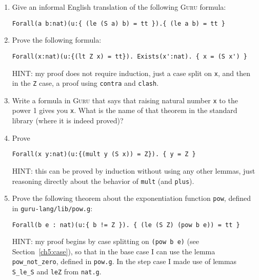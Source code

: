 \documentclass{book}[12pt]
\newcommand{\guru}[0]{\textsc{Guru}\xspace}
\begin{document}
\begin{enumerate}

\item Give an informal English translation of the following \guru formula:

\begin{verbatim}
Forall(a b:nat)(u:{ (le (S a) b) = tt }).{ (le a b) = tt }
\end{verbatim}

\item Prove the following formula:

\begin{verbatim}
Forall(x:nat)(u:{(lt Z x) = tt}). Exists(x':nat). { x = (S x') }
\end{verbatim}

\noindent HINT: my proof does not require induction, just a case split
on \texttt{x}, and then in the \texttt{Z} case, a proof using
\texttt{contra} and \texttt{clash}.

\item Write a formula in \guru that says that raising natural number
\texttt{x} to the power 1 gives you \texttt{x}.  What is the name of
that theorem in the standard library (where it is indeed proved)?

\item Prove

\begin{verbatim}
Forall(x y:nat)(u:{(mult y (S x)) = Z}). { y = Z }
\end{verbatim}

\noindent HINT: this can be proved by induction without using any
other lemmas, just reasoning directly about the behavior of
\texttt{mult} (and \texttt{plus}).

\item Prove the following theorem about the exponentiation function
\texttt{pow}, defined in \texttt{guru-lang/lib/pow.g}:

\begin{verbatim}
Forall(b e : nat)(u:{ b != Z }). { (le (S Z) (pow b e)) = tt }
\end{verbatim}

\noindent HINT: my proof begins by case splitting on \texttt{(pow b
e)} (see Section~\ref{ch5:case}), so that in the base case I can use
the lemma \texttt{pow\_not\_zero}, defined in \texttt{pow.g}.  In the
step case I made use of lemmas \texttt{S\_le\_S} and \texttt{leZ} from
\texttt{nat.g}.

\end{enumerate}



\end{document}
